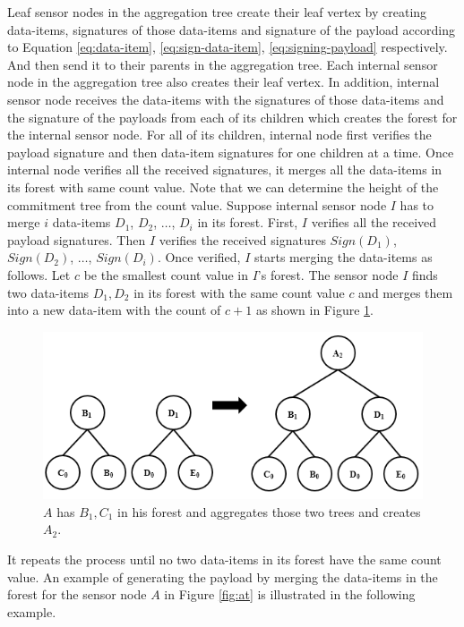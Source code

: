 	Leaf sensor nodes in the aggregation tree create their leaf vertex by creating data-items, signatures of those data-items and signature of the payload according to Equation \ref{eq:data-item}, \ref{eq:sign-data-item}, \ref{eq:signing-payload} respectively.
	And then send it to their parents in the aggregation tree.	
	Each internal sensor node in the aggregation tree also creates their leaf vertex.
	In addition, internal sensor node receives the data-items with the signatures of those data-items and the signature of the payloads from each of its children which creates the forest for the internal sensor node.
	For all of its children, internal node first verifies the payload signature and then data-item signatures for one children at a time.
	Once internal node verifies all the received signatures, it merges all the data-items in its forest with same count value.
	Note that we can determine the height of the commitment tree from the count value.
	Suppose internal sensor node $I$ has to merge $i$ data-items $D_{1}$, $D_{2}$, $\dotsc$, $D_{i}$ in its forest.
	First, $I$ verifies all the received payload signatures.
	Then $I$ verifies the received signatures $Sign(D_{1})$, $Sign(D_{2})$, $\dotsc$, $Sign(D_{i})$.
	Once verified, $I$ starts merging the data-items as follows.
	Let $c$ be the smallest count value in $I$'s forest.
	The sensor node $I$ finds two data-items $D_{1},D_{2}$ in its forest with the same count value $c$ and merges them into a new data-item with the count of $c+1$ as shown in Figure \ref{fig:increase-height}.
	\begin{figure}[h!]
		\includegraphics[width=6in]{images/increase-height.png}
		\caption{$A$ has $B_{1}, C_{1}$ in his forest and aggregates those two trees and creates $A_{2}$.}
		\label{fig:increase-height}
	\end{figure}
	It repeats the process until no two data-items in its forest have the same count value.
	An example of generating the payload by merging the data-items in the forest for the sensor node $A$ in Figure \ref{fig:at} is illustrated in the following example.
	
